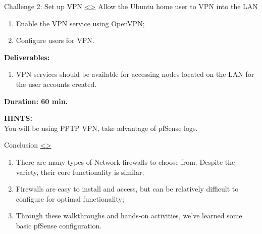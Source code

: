 \documentclass[12pt]{extarticle}
\newenvironment{instructionblock}{\Large\bgroup}{\egroup}
\newcommand{\ben}{\begin{enumerate}}
\newcommand{\een}{\end{enumerate}}
\begin{document}
\pagebreak
\begin{slide}{ Challenge 2: Set up VPN }{ \hyperref[slide 13]{\textless}\hyperref[slide 15]{\textgreater} }
	\vskip 5pt
\begin{instructionblock}
	Allow the Ubuntu home user to VPN into the LAN
	\begin{enumerate}
	\item Enable the VPN service using OpenVPN;
	\item Configure users for VPN.
	\end{enumerate}

	\textbf{\Large{Deliverables:}}
	\ben
		\item VPN services should be available for accessing nodes located on the LAN for the user accounts created.
	\een

  \vspace{20mm}
  \begin{center}
  \textbf{\Large{Duration: 60 min.} }
  \end{center}

\end{instructionblock}
\end{slide}  


\vspace{8mm}
\noindent
\textbf{HINTS:}\\
You will be using PPTP VPN, take advantage of pfSense logs.








\pagebreak
\begin{slide}{ Conclusion }{ \hyperref[slide 14]{\textless}\hyperref[slide 16]{\textgreater} }
	\begin{instructionblock}
		\begin{enumerate}
			\item There are many types of Network firewalls to choose from. Despite the variety, their core functionality is similar;
			\item Firewalls are easy to install and access, but can be relatively difficult to configure for optimal functionality;
			\item Through these walkthroughs and hands-on activities, we've learned some basic pfSense configuration.
		\end{enumerate}
	\end{instructionblock}
\end{slide}
\end{document}
